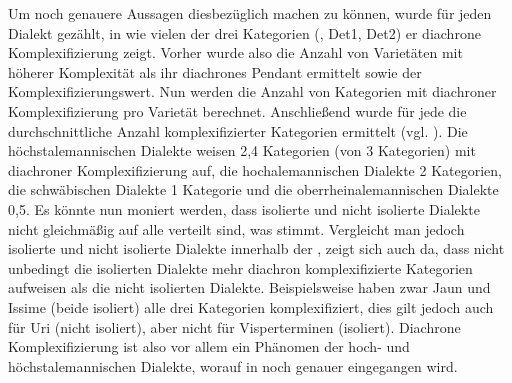 Um noch genauere Aussagen diesbezüglich machen zu können, wurde für jeden Dialekt gezählt, in wie vielen der drei Kategorien (, Det1, Det2) er diachrone Komplexifizierung zeigt. Vorher wurde also die Anzahl von Varietäten mit höherer Komplexität als ihr diachrones Pendant ermittelt sowie der Komplexifizierungswert. Nun werden die Anzahl von Kategorien mit diachroner Komplexifizierung pro Varietät berechnet. Anschließend wurde für jede  die durchschnittliche Anzahl komplexifizierter Kategorien ermittelt (vgl. ). Die höchstalemannischen Dialekte weisen 2,4 Kategorien (von 3 Kategorien) mit diachroner Komplexifizierung auf, die hochalemannischen Dialekte 2 Kategorien, die schwäbischen Dialekte 1 Kategorie und die oberrheinalemannischen Dialekte 0,5. Es könnte nun moniert werden, dass isolierte und nicht isolierte Dialekte nicht gleichmäßig auf alle  verteilt sind, was stimmt. Vergleicht man jedoch isolierte und nicht isolierte Dialekte innerhalb der , zeigt sich auch da, dass nicht unbedingt die isolierten Dialekte mehr diachron komplexifizierte Kategorien aufweisen als die nicht isolierten Dialekte. Beispielsweise haben zwar Jaun und Issime (beide isoliert) alle drei Kategorien komplexifiziert, dies gilt jedoch auch für Uri (nicht isoliert), aber nicht für Visperterminen (isoliert). Diachrone Komplexifizierung ist also vor allem ein Phänomen der hoch- und höchstalemannischen Dialekte, worauf in  noch genauer eingegangen wird.\\


